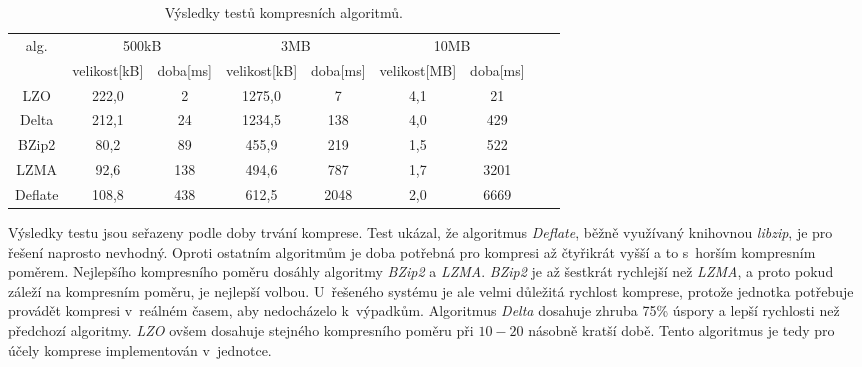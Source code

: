 \begin{table}[h]
    \begin{center}
        \begin{tabular}{|c|c|c|c|c|c|c|c|c|}
        \hline
        \multirow{2}{*}{alg.} & \multicolumn{2}{c|}{500kB}      & \multicolumn{2}{c|}{3MB}        & \multicolumn{2}{c|}{10MB}       \\ \cline{2-7} 
                                    & velikost{[kB]} & doba{[ms]} & velikost{[kB]} & doba{[ms]} & velikost{[MB]} & doba{[ms]} \\ \hline
        LZO                         & 222,0            & 2            & 1275,0           & 7            & 4,1              & 21           \\ \hline
        Delta                       & 212,1            & 24           & 1234,5           & 138          & 4,0              & 429          \\ \hline
        BZip2                       & 80,2             & 89           & 455,9            & 219          & 1,5              & 522          \\ \hline
        LZMA                        & 92,6             & 138          & 494,6            & 787          & 1,7              & 3201         \\ \hline
        Deflate                     & 108,8            & 438          & 612,5            & 2048         & 2,0              & 6669         \\ \hline
    \end{tabular}\caption{Výsledky testů kompresních algoritmů.} \label{tab:compress_test}
    \end{center}
\end{table}

Výsledky testu jsou seřazeny podle doby trvání komprese. Test ukázal, že algoritmus \textit{Deflate}, běžně využívaný knihovnou \textit{libzip}, je pro řešení naprosto nevhodný. Oproti ostatním algoritmům je doba potřebná pro kompresi až čtyřikrát vyšší a to s~horším kompresním poměrem. Nejlepšího kompresního poměru dosáhly algoritmy \textit{BZip2} a \textit{LZMA}. \textit{BZip2} je až šestkrát rychlejší než \textit{LZMA}, a proto pokud záleží na kompresním poměru, je nejlepší volbou. U~řešeného systému je ale velmi důležitá rychlost komprese, protože jednotka potřebuje provádět kompresi v~reálném časem, aby nedocházelo k~výpadkům. Algoritmus \textit{Delta} dosahuje zhruba 75\% úspory a lepší rychlosti než předchozí algoritmy. \textit{LZO} ovšem dosahuje stejného kompresního poměru při $10-20$ násobně kratší době. Tento algoritmus je tedy pro účely komprese implementován v~jednotce. 

